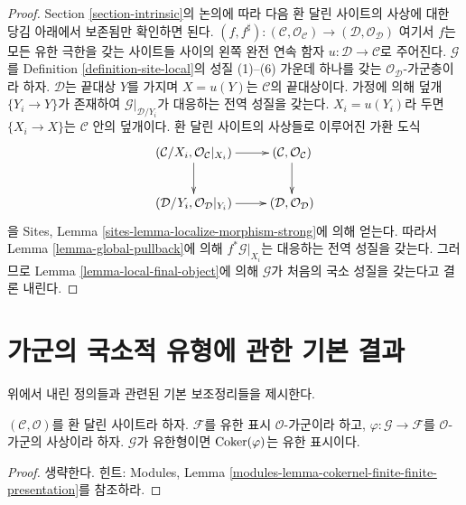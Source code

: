 \begin{proof}
Section \ref{section-intrinsic}의 논의에 따라 다음 환 달린 사이트의 사상에
대한 당김 아래에서 보존됨만 확인하면 된다.
$(f, f^\sharp) :
(\mathcal{C}, \mathcal{O}_\mathcal{C})
\to
(\mathcal{D}, \mathcal{O}_\mathcal{D})$
여기서 $f$는 모든 유한 극한을 갖는 사이트들 사이의 왼쪽 완전 연속 함자
$u : \mathcal{D} \to \mathcal{C}$로 주어진다. $\mathcal{G}$를 Definition
\ref{definition-site-local}의 성질 (1)--(6) 가운데 하나를 갖는
$\mathcal{O}_\mathcal{D}$-가군층이라 하자. $\mathcal{D}$는 끝대상 $Y$를
가지며 $X = u(Y)$는 $\mathcal{C}$의 끝대상이다. 가정에 의해 덮개
$\{Y_i \to Y\}$가 존재하여 $\mathcal{G}|_{\mathcal{D}/Y_i}$가 대응하는
전역 성질을 갖는다. $X_i = u(Y_i)$라 두면 $\{X_i \to X\}$는
$\mathcal{C}$ 안의 덮개이다. 환 달린 사이트의 사상들로 이루어진 가환 도식
$$
\xymatrix{
(\mathcal{C}/X_i, \mathcal{O}_\mathcal{C}|_{X_i}) \ar[r] \ar[d] &
(\mathcal{C}, \mathcal{O}_\mathcal{C}) \ar[d] \\
(\mathcal{D}/Y_i, \mathcal{O}_\mathcal{D}|_{Y_i}) \ar[r] &
(\mathcal{D}, \mathcal{O}_\mathcal{D})
}
$$
을 Sites, Lemma \ref{sites-lemma-localize-morphism-strong}에 의해 얻는다.
따라서 Lemma \ref{lemma-global-pullback}에 의해
$f^*\mathcal{G}|_{X_i}$는 대응하는 전역 성질을 갖는다. 그러므로 Lemma
\ref{lemma-local-final-object}에 의해 $\mathcal{G}$가 처음의 국소 성질을
갖는다고 결론 내린다.
\end{proof}







\section{가군의 국소적 유형에 관한 기본 결과}
\label{section-basics}

\noindent
위에서 내린 정의들과 관련된 기본 보조정리들을 제시한다.

\begin{lemma}
\label{lemma-cokernel-finite-finite-presentation}
$(\mathcal{C},\mathcal{O})$를 환 달린 사이트라 하자. $\mathcal{F}$를 유한
표시 $\mathcal{O}$-가군이라 하고,
$\varphi : \mathcal{G} \to \mathcal{F}$를 $\mathcal{O}$-가군의 사상이라
하자. $\mathcal{G}$가 유한형이면 $\mathop{\mathrm{Coker}}(\varphi)$는 유한 표시이다.
\end{lemma}

\begin{proof}
생략한다. 힌트: Modules, Lemma
\ref{modules-lemma-cokernel-finite-finite-presentation}를 참조하라.
\end{proof}

